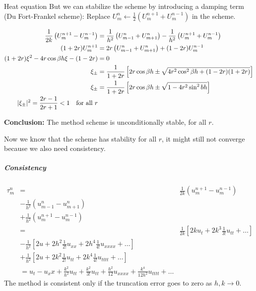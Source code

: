 \begin{example}{Heat equation}{}
  But we can stabilize the scheme by introducing a damping term (Du Fort-Frankel scheme):
  Replace \( U_m^n \leftarrow \frac{1}{2}(U_m^{n+1} + U_m^{n-1}) \) in the scheme.

  \begin{align*}
    \frac{1}{2k}\left( U_m^{n+1} - U_m^{n-1} \right)
     & =
    \frac{1}{h^2}\left( U_{m-1}^n + U_{m+1}^n\right) - \frac{1}{h^2}\left( U_m^{n+1} + U_m^{n-1} \right) \\
    (1 + 2r)U_m^{n+1}
     & =
    2r\left( U_{m-1}^n + U_{m+1}^n \right) + (1 - 2r)U_m^{n-1}                                           \\
    (1 + 2r)\xi^2 - 4r \cos \beta h \xi - (1 - 2r)
     & = 0                                                                                               \\
    \xi_\pm
     & = \frac{1}{1 + 2r} \left[ 2r\cos \beta h \pm \sqrt{4r^2\cos^2 \beta h + (1 - 2r)(1 + 2r)} \right] \\
    \xi_\pm
     & = \frac{1}{1 + 2r} \left[ 2r\cos \beta h \pm \sqrt{1 - 4r^2 \sin^2 {bh}} \right]                  \\
    \lvert\xi_\pm\rvert^2 = \frac{2r - 1}{2r + 1} < 1 \quad \text{for all } r                                  \\
  \end{align*}

  \textbf{Conclusion:} The method scheme is unconditionally stable, for all \( r \).

  Now we know that the scheme has stability for all \( r \), it might still not converge because we also need consistency.

  \subparagraph{Consistency}
  \begin{align*}
    \tau_m^n
     & =
     & \frac{1}{2k}\left( u_m^{n+1} - u_m^{n-1} \right)                                                 \\
     & - \frac{1}{h^2}\left( u_{m-1}^n - u_{m+1}^n \right)                                              \\
     & + \frac{1}{h^2}\left( u_m^{n+1} - u_m^{n-1} \right)                                              \\
     & =
     & \frac{1}{2k}\left[ 2k u_t + 2k^3 \frac{1}{3!}u_{tt} + \ldots \right]                             \\
     & -\frac{1}{h^2}\left[ 2u + 2h^2 \frac{1}{2!}u_{xx} + 2h^4 \frac{1}{4!}u_{xxxx} + \ldots \right]   \\
     & + \frac{1}{h^2}\left[ 2 u + 2k^2 \frac{1}{2!}u_{tt} + 2k^4 \frac{1}{4!}u_{tttt} + \ldots \right] \\
     & =
    u_t - u_xx 
    + \frac{k^2}{h^2}u_{tt} + \frac{k^2}{3!}u_{tt} 
    + \frac{h^2}{12}u_{xxxx} + \frac{k^4}{12h^2}u_{tttt} 
    + \ldots
  \end{align*}
  The method is consistent only if the truncation error goes to zero as \( h, k \to 0 \).


\end{example}
